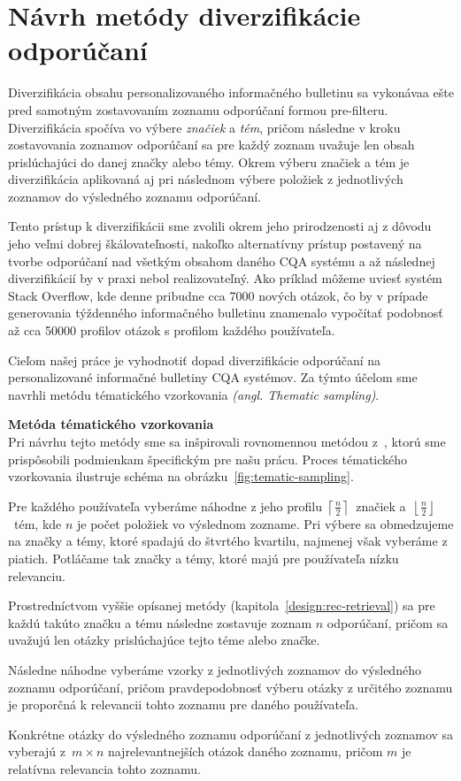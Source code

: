 \section{Návrh metódy diverzifikácie odporúčaní}

Diverzifikácia obsahu personalizovaného informačného bulletinu sa vykonávaa ešte pred samotným zostavovaním
zoznamu odporúčaní formou pre-filteru. Diverzifikácia spočíva vo výbere \textit{značiek} a \textit{tém}, pričom
následne v kroku zostavovania zoznamov odporúčaní sa pre každý zoznam uvažuje len obsah prislúchajúci do danej
značky alebo témy. Okrem výberu značiek a tém je diverzifikácia aplikovaná aj pri následnom výbere položiek z jednotlivých
zoznamov do výsledného zoznamu odporúčaní.

Tento prístup k diverzifikácii sme zvolili okrem jeho prirodzenosti aj z dôvodu jeho veľmi dobrej škálovateľnosti,
nakoľko alternatívny prístup postavený na tvorbe odporúčaní nad všetkým obsahom daného CQA systému a až následnej
diverzifikácií by v praxi nebol realizovateľný. Ako príklad môžeme uviesť systém Stack Overflow, kde denne pribudne
cca 7000 nových otázok, čo by v prípade generovania týždenného informačného bulletinu znamenalo vypočítať podobnosť
až cca 50000 profilov otázok s profilom každého používateľa.

Cieľom našej práce je vyhodnotiť dopad diverzifikácie odporúčaní na personalizované informačné bulletiny CQA systémov.
Za týmto účelom sme navrhli metódu tématického vzorkovania \textit{(angl. Thematic sampling)}.


\textbf{Metóda tématického vzorkovania}\\
\label{sec:thematic-sampling}
Pri návrhu tejto metódy sme sa inšpirovali rovnomennou metódou z~\cite{Szpektor2013}, ktorú sme prispôsobili
podmienkam špecifickým pre našu prácu. Proces tématického vzorkovania ilustruje schéma na obrázku~\ref{fig:tematic-sampling}.
\begin{my_enumerate}
\item{Pre každého používateľa vyberáme náhodne z jeho profilu $\left\lceil\frac{n}{2}\right\rceil$~značiek
    a~$\left\lfloor\frac{n}{2}\right\rfloor$~tém, kde $n$ je počet položiek vo výslednom zozname. Pri výbere sa obmedzujeme na značky a témy,
    ktoré spadajú do štvrtého kvartilu, najmenej však vyberáme z piatich. Potláčame tak značky a témy, ktoré majú pre používateľa nízku relevanciu.}
\item{
    Prostredníctvom vyššie opísanej metódy (kapitola~\ref{design:rec-retrieval}) sa pre každú takúto značku a tému
    následne zostavuje zoznam $n$ odporúčaní, pričom sa uvažujú len otázky prislúchajúce tejto téme alebo značke.}
\item{
    Následne náhodne vyberáme vzorky z jednotlivých zoznamov do výsledného zoznamu odporúčaní, pričom pravdepodobnosť
    výberu otázky z určitého zoznamu je proporčná k relevancii tohto zoznamu pre daného používateľa.}
\item{
    Konkrétne otázky do výsledného zoznamu odporúčaní z jednotlivých zoznamov sa vyberajú z~$m \times n$ najrelevantnejších otázok daného zoznamu,
    pričom $m$ je relatívna relevancia tohto zoznamu.}
\end{my_enumerate}

